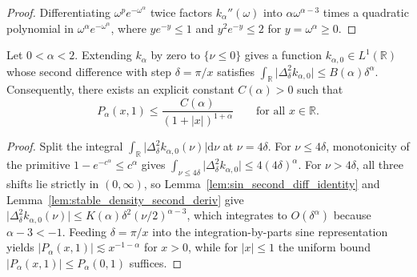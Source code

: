 \begin{proof}
\leanok
Differentiating $\omega^p e^{-\omega^\alpha}$ twice factors $k_\alpha''(\omega)$ into $\alpha \omega^{\alpha - 3}$ times a quadratic polynomial in $\omega^\alpha e^{-\omega^\alpha}$, where $y e^{-y} \le 1$ and $y^2 e^{-y} \le 2$ for $y = \omega^\alpha \ge 0$.
\end{proof}

\begin{theorem}\label{thm:stable_kernel_decay_all_alpha}
\leanok
Let $0 < \alpha < 2$. Extending $k_\alpha$ by zero to $\{\nu \le 0\}$ gives a function $k_{\alpha, 0} \in L^1(\mathbb{R})$ whose second difference with step $\delta = \pi / x$ satisfies $\int_{\mathbb{R}} \lvert \Delta_\delta^2 k_{\alpha, 0} \rvert \le B(\alpha) \delta^\alpha$. Consequently, there exists an explicit constant $C(\alpha) > 0$ such that
\[
  P_\alpha(x, 1) \le \frac{C(\alpha)}{(1 + \lvert x \rvert)^{1 + \alpha}} \qquad \text{for all } x \in \mathbb{R}.
\]
\end{theorem}

\begin{proof}
\leanok
Split the integral $\int_{\mathbb{R}} \lvert \Delta_\delta^2 k_{\alpha, 0}(\nu) \rvert \mathrm{d}\nu$ at $\nu = 4\delta$. For $\nu \le 4\delta$, monotonicity of the primitive $1 - e^{-c^\alpha} \le c^\alpha$ gives $\int_{\nu \le 4\delta} \lvert \Delta_\delta^2 k_{\alpha, 0} \rvert \le 4(4\delta)^\alpha$. For $\nu > 4\delta$, all three shifts lie strictly in $(0, \infty)$, so Lemma~\ref{lem:sin_second_diff_identity} and Lemma~\ref{lem:stable_density_second_deriv} give $\lvert \Delta_\delta^2 k_{\alpha, 0}(\nu) \rvert \le K(\alpha) \delta^2 (\nu / 2)^{\alpha - 3}$, which integrates to $O(\delta^\alpha)$ because $\alpha - 3 < -1$. Feeding $\delta = \pi / x$ into the integration-by-parts sine representation yields $\lvert P_\alpha(x, 1) \rvert \lesssim x^{-1-\alpha}$ for $x > 0$, while for $\lvert x \rvert \le 1$ the uniform bound $\lvert P_\alpha(x, 1) \rvert \le P_\alpha(0, 1)$ suffices.
\end{proof}
